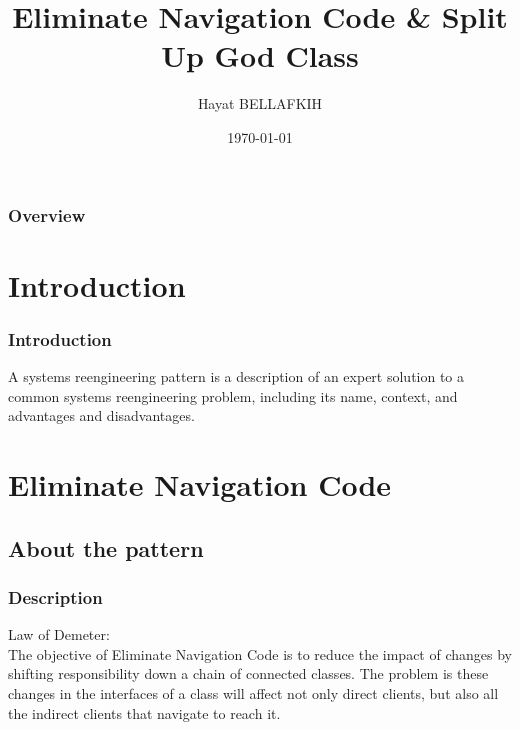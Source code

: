 \documentclass{beamer}
\title[Redistribute Responsibilities]{Eliminate Navigation Code \& Split Up God Class} %
\author{Hayat BELLAFKIH} %
\institute[UMONS] %
{
University of Mons\\ %
\medskip
\textit{hayat.BELLAFKIH@student.umons.ac.be} %
}
\date{\today} %
\begin{document}
\begin{frame}
\titlepage %
\end{frame}

\begin{frame}
\frametitle{Overview} %
\tableofcontents %
\end{frame}


\section{Introduction} 
\begin{frame}
\frametitle{Introduction}
A systems reengineering pattern is a description of an expert solution to a common systems reengineering problem, including its name, context, and advantages and disadvantages.
\end{frame}
\section{Eliminate Navigation Code}
\subsection{About the pattern}
\begin{frame}
\frametitle{Description}
Law of Demeter:\\
The objective of Eliminate Navigation Code is to reduce the impact of changes by shifting responsibility down a chain of connected classes. The problem is these changes in the interfaces of a class will affect not only direct clients, but also all the indirect clients that navigate to reach it. 
\end{frame}
\end{document}

